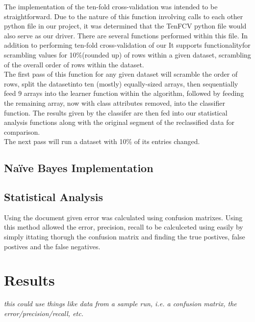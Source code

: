 \documentclass[twoside,11pt]{article}
\begin{document}
The implementation of the ten-fold cross-validation was intended to be straightforward. 
Due to the nature of this function involving calls to each other python file in our 
project, it was determined that the TenFCV python file would also serve as our driver. 
There are several functions performed within this file. In addition to performing 
ten-fold cross-validation of our It supports functionalityfor scrambling values for 
10\%(rounded up) of rows within a given dataset, scrambling of the overall order of 
rows within the dataset.\\
The first pass of this function for any given dataset will scramble the order of rows, 
split the datasetinto ten (mostly) equally-sized arrays, then sequentially feed 9 arrays 
into the learner function within the algorithm, followed by feeding the remaining array, 
now with class attributes removed, into the classifier function. The results given by 
the classifer are then fed into our statistical analysis functions along with the original 
segment of the reclassified data for comparison.\\
The next pass will run a dataset with 10\% of its entries changed.

\subsection{Naïve Bayes Implementation}

\subsection{Statistical Analysis}
Using the document given \citep{Precision} error was calculated using confusion matrixes.
Using this method allowed the error, precision, recall to be calculceted using easily by simply
ittating thorugh the confusion matrix and finding the true postives, false postives and the 
false negatives.  


\section{Results}

\emph{this could use things like data from a sample run, i.e. a confusion matrix, the error/precision/recall, etc.}



\end{document}
